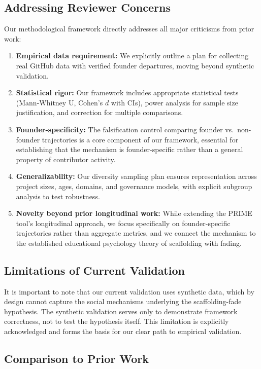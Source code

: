 \documentclass[11pt,letterpaper]{article}
\begin{document}
\subsection{Addressing Reviewer Concerns}

Our methodological framework directly addresses all major criticisms from prior work:

\begin{enumerate}
  \item \textbf{Empirical data requirement:} We explicitly outline a plan for collecting real GitHub data with verified founder departures, moving beyond synthetic validation.
  \item \textbf{Statistical rigor:} Our framework includes appropriate statistical tests (Mann-Whitney U, Cohen's $d$ with CIs), power analysis for sample size justification, and correction for multiple comparisons.
  \item \textbf{Founder-specificity:} The falsification control comparing founder vs.\ non-founder trajectories is a core component of our framework, essential for establishing that the mechanism is founder-specific rather than a general property of contributor activity.
  \item \textbf{Generalizability:} Our diversity sampling plan ensures representation across project sizes, ages, domains, and governance models, with explicit subgroup analysis to test robustness.
  \item \textbf{Novelty beyond prior longitudinal work:} While extending the PRIME tool's longitudinal approach, we focus specifically on founder-specific trajectories rather than aggregate metrics, and we connect the mechanism to the established educational psychology theory of scaffolding with fading.
\end{enumerate}

\subsection{Limitations of Current Validation}

It is important to note that our current validation uses synthetic data, which by design cannot capture the social mechanisms underlying the scaffolding-fade hypothesis. The synthetic validation serves only to demonstrate framework correctness, not to test the hypothesis itself. This limitation is explicitly acknowledged and forms the basis for our clear path to empirical validation.

\subsection{Comparison to Prior Work}
\end{document}
